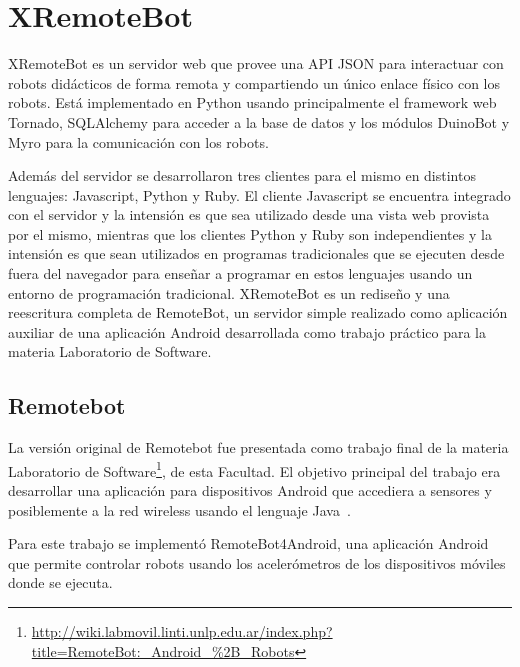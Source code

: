 \chapter{XRemoteBot}\label{cha:xremotebot}




XRemoteBot es un servidor web que provee una API JSON para interactuar
con robots didácticos de forma remota y compartiendo un único enlace
físico con los robots. Está implementado en Python usando principalmente el
framework web Tornado, SQLAlchemy para acceder a la base de datos
y los módulos DuinoBot y Myro para
la comunicación con los robots.

Además del servidor se desarrollaron tres clientes para el mismo en distintos
lenguajes: Javascript, Python y Ruby. El cliente Javascript se encuentra
integrado con el servidor y la intensión es que sea utilizado desde una
vista web provista por el mismo, mientras que los clientes Python y Ruby
son independientes y la intensión es que sean utilizados en programas
tradicionales que se ejecuten desde fuera del navegador para enseñar
a programar en estos lenguajes usando un entorno de programación
tradicional. XRemoteBot
es un rediseño y una reescritura completa de RemoteBot, un servidor
simple realizado como aplicación auxiliar de una aplicación Android
desarrollada
como trabajo práctico para la materia Laboratorio de Software.

\section{Remotebot}\label{sec:remotebot}

La versión original de Remotebot fue presentada como trabajo final
de la materia Laboratorio de
Software\footnote{\url{http://wiki.labmovil.linti.unlp.edu.ar/index.php?title=RemoteBot:_Android_\%2B_Robots}},
de esta Facultad.
El objetivo principal del trabajo era desarrollar una aplicación para
dispositivos Android que accediera a sensores y posiblemente a la red
wireless usando el lenguaje Java~\citep{queiruga_2013}.

Para este trabajo se implementó RemoteBot4Android,
una aplicación Android
que permite controlar robots usando los acelerómetros de los dispositivos
móviles donde se ejecuta.

